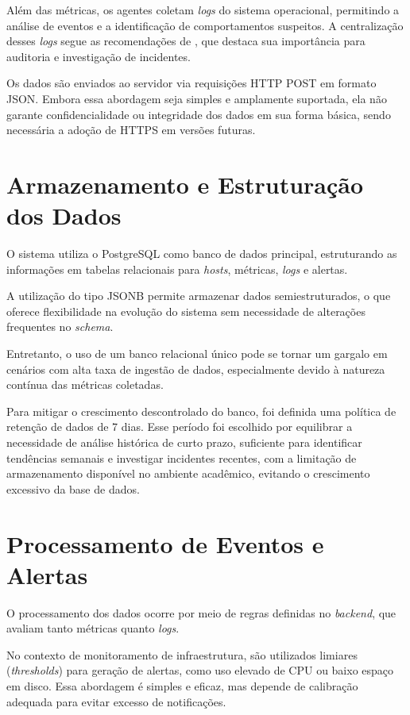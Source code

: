 \documentclass[
    12pt
    ,oneside
    ,a4paper
    ,chapter=TITLE
    ,section=TITLE
    ,sumario=abnt-6027-2012]{abntex2}
\begin{document}
Além das métricas, os agentes coletam \textit{logs} do sistema operacional, permitindo a análise de eventos e a identificação de comportamentos suspeitos. A centralização desses \textit{logs} segue as recomendações de , que destaca sua importância para auditoria e investigação de incidentes.

Os dados são enviados ao servidor via requisições HTTP POST em formato JSON. Embora essa abordagem seja simples e amplamente suportada, ela não garante confidencialidade ou integridade dos dados em sua forma básica, sendo necessária a adoção de HTTPS em versões futuras.

\section{Armazenamento e Estruturação dos Dados}

O sistema utiliza o PostgreSQL como banco de dados principal, estruturando as informações em tabelas relacionais para \textit{hosts}, métricas, \textit{logs} e alertas.

A utilização do tipo JSONB permite armazenar dados semiestruturados, o que oferece flexibilidade na evolução do sistema sem necessidade de alterações frequentes no \textit{schema}.

Entretanto, o uso de um banco relacional único pode se tornar um gargalo em cenários com alta taxa de ingestão de dados, especialmente devido à natureza contínua das métricas coletadas.

Para mitigar o crescimento descontrolado do banco, foi definida uma política de retenção de dados de 7 dias. Esse período foi escolhido por equilibrar a necessidade de análise histórica de curto prazo, suficiente para identificar tendências semanais e investigar incidentes recentes, com a limitação de armazenamento disponível no ambiente acadêmico, evitando o crescimento excessivo da base de dados.

\section{Processamento de Eventos e Alertas}

O processamento dos dados ocorre por meio de regras definidas no \textit{backend}, que avaliam tanto métricas quanto \textit{logs}.

No contexto de monitoramento de infraestrutura, são utilizados limiares (\textit{thresholds}) para geração de alertas, como uso elevado de CPU ou baixo espaço em disco. Essa abordagem é simples e eficaz, mas depende de calibração adequada para evitar excesso de notificações.
\end{document}
